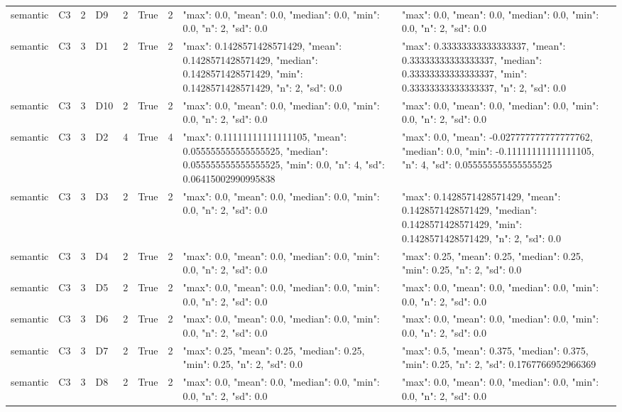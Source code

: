 \begin{tabular}{lllllllll}
semantic & C3 & 2 & D9 & 2 & True & 2 & {"max": 0.0, "mean": 0.0, "median": 0.0, "min": 0.0, "n": 2, "sd": 0.0} & {"max": 0.0, "mean": 0.0, "median": 0.0, "min": 0.0, "n": 2, "sd": 0.0} \\
semantic & C3 & 3 & D1 & 2 & True & 2 & {"max": 0.1428571428571429, "mean": 0.1428571428571429, "median": 0.1428571428571429, "min": 0.1428571428571429, "n": 2, "sd": 0.0} & {"max": 0.33333333333333337, "mean": 0.33333333333333337, "median": 0.33333333333333337, "min": 0.33333333333333337, "n": 2, "sd": 0.0} \\
semantic & C3 & 3 & D10 & 2 & True & 2 & {"max": 0.0, "mean": 0.0, "median": 0.0, "min": 0.0, "n": 2, "sd": 0.0} & {"max": 0.0, "mean": 0.0, "median": 0.0, "min": 0.0, "n": 2, "sd": 0.0} \\
semantic & C3 & 3 & D2 & 4 & True & 4 & {"max": 0.11111111111111105, "mean": 0.055555555555555525, "median": 0.055555555555555525, "min": 0.0, "n": 4, "sd": 0.06415002990995838} & {"max": 0.0, "mean": -0.027777777777777762, "median": 0.0, "min": -0.11111111111111105, "n": 4, "sd": 0.055555555555555525} \\
semantic & C3 & 3 & D3 & 2 & True & 2 & {"max": 0.0, "mean": 0.0, "median": 0.0, "min": 0.0, "n": 2, "sd": 0.0} & {"max": 0.1428571428571429, "mean": 0.1428571428571429, "median": 0.1428571428571429, "min": 0.1428571428571429, "n": 2, "sd": 0.0} \\
semantic & C3 & 3 & D4 & 2 & True & 2 & {"max": 0.0, "mean": 0.0, "median": 0.0, "min": 0.0, "n": 2, "sd": 0.0} & {"max": 0.25, "mean": 0.25, "median": 0.25, "min": 0.25, "n": 2, "sd": 0.0} \\
semantic & C3 & 3 & D5 & 2 & True & 2 & {"max": 0.0, "mean": 0.0, "median": 0.0, "min": 0.0, "n": 2, "sd": 0.0} & {"max": 0.0, "mean": 0.0, "median": 0.0, "min": 0.0, "n": 2, "sd": 0.0} \\
semantic & C3 & 3 & D6 & 2 & True & 2 & {"max": 0.0, "mean": 0.0, "median": 0.0, "min": 0.0, "n": 2, "sd": 0.0} & {"max": 0.0, "mean": 0.0, "median": 0.0, "min": 0.0, "n": 2, "sd": 0.0} \\
semantic & C3 & 3 & D7 & 2 & True & 2 & {"max": 0.25, "mean": 0.25, "median": 0.25, "min": 0.25, "n": 2, "sd": 0.0} & {"max": 0.5, "mean": 0.375, "median": 0.375, "min": 0.25, "n": 2, "sd": 0.1767766952966369} \\
semantic & C3 & 3 & D8 & 2 & True & 2 & {"max": 0.0, "mean": 0.0, "median": 0.0, "min": 0.0, "n": 2, "sd": 0.0} & {"max": 0.0, "mean": 0.0, "median": 0.0, "min": 0.0, "n": 2, "sd": 0.0} \\

\end{tabular}
